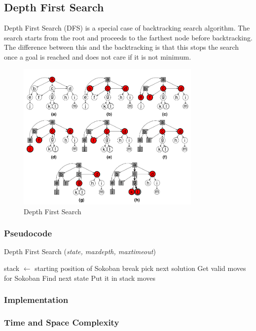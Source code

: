 \subsection{Depth First Search}
\noindent Depth First Search (DFS) is a special case of backtracking search algorithm. The search starts from the root and proceeds to the farthest node before backtracking. The difference between this and the backtracking is that this stops the search once a goal is reached and does not care if it is not minimum.

\begin{figure}[H]
	\centering
	\includegraphics[width=0.8\textwidth]{./imgs/dfs.png}
	\caption{Depth First Search}
\end{figure}

\subsubsection{Pseudocode}
\begin{algorithm}[H]
	\caption{Depth First Search (\textit{state, maxdepth, maxtimeout})}
	\label{alg:dfs}
	\begin{algorithmic}[1]
	\State stack $\gets$ starting position of Sokoban
			\State break
		\Else
				\State pick next solution
			\Else
				\State Get valid moves for Sokoban
					\State Find next state
					\State Put it in stack
				\EndFor
			\EndIf
		\EndIf
	\EndWhile
	\State \Return moves
	\end{algorithmic}
\end{algorithm}

\subsubsection{Implementation}

\subsubsection{Time and Space Complexity}